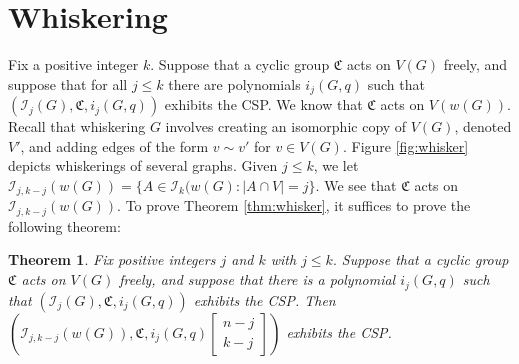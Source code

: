 \documentclass[12pt]{article}
\newtheorem{theorem}{Theorem}%
\theoremstyle{definition}
\newcommand{\gau}[2]{\left[ \begin{array}{c} #1 \\ #2 \end{array} \right]}
\begin{document}
\section{Whiskering}
\label{sec:whisker}

Fix a positive integer $k$.
Suppose that a cyclic group $\mathfrak{C}$ acts on $V(G)$ freely, and suppose that for all $j \leq k$ there are polynomials $i_j(G,q)$ such that $(\mathcal{I}_j(G), \mathfrak{C}, i_j(G,q))$ exhibits the CSP. 
We know that $\mathfrak{C}$ acts on $V(w(G)).$ Recall that whiskering $G$ involves creating an isomorphic copy of $V(G)$, denoted $V'$, and adding edges of the form $v\sim v'$ for $v \in V(G)$. Figure \ref{fig:whisker} depicts whiskerings of several graphs. Given $j \leq k$, we let $\mathcal{I}_{j,k-j}(w(G)) = \{A \in \mathcal{I}_k(w(G): |A \cap V| = j \}$. We see that $\mathfrak{C}$ acts on $\mathcal{I}_{j,k-j}(w(G)).$
To prove Theorem \ref{thm:whisker}, it suffices to prove the following theorem:

\begin{theorem}
Fix positive integers $j$ and $k$ with $j \leq k.$
Suppose that a cyclic group $\mathfrak{C}$ acts on $V(G)$ freely, and suppose that there is a polynomial $i_j(G,q)$ such that $(\mathcal{I}_j(G), \mathfrak{C}, i_j(G,q))$ exhibits the CSP.
Then
$\left(\mathcal{I}_{j,k-j}(w(G)), \mathfrak{C}, i_j(G,q) \gau{n-j}{k-j}\right)$ exhibits the CSP. 
\end{theorem}
\end{document}
